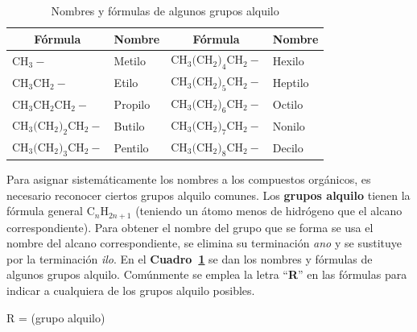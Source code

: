 \begin{table}[hbt]
\caption[Grupos alquilo]{Nombres y f\'ormulas de algunos grupos alquilo}
\label{a-nom}
\begin{center}
\begin{tabular}{ll l l}\hline
\multicolumn{1}{c}{\textbf{F\'ormula}}&\multicolumn{1}{c}{\textbf{Nombre}}&
 \multicolumn{1}{c}{\textbf{F\'ormula}}&\multicolumn{1}{c}{\textbf{Nombre}}\\ \hline
CH$_3-$                & Metilo  &CH$_3($CH$_2)_4$CH$_2-$ & Hexilo \\
CH$_3$CH$_2-$          & Etilo   &CH$_3($CH$_2)_5$CH$_2-$ & Heptilo \\
CH$_3$CH$_2$CH$_2-$    & Propilo &CH$_3($CH$_2)_6$CH$_2-$ & Octilo \\
CH$_3($CH$_2)_2$CH$_2-$& Butilo  &CH$_3($CH$_2)_7$CH$_2-$ & Nonilo \\
CH$_3($CH$_2)_3$CH$_2-$& Pentilo &CH$_3($CH$_2)_8$CH$_2-$ & Decilo \\\hline
\end{tabular}
\end{center}
\end{table}
Para asignar sistem\'aticamente los nombres a los compuestos org\'anicos, es necesario  reconocer ciertos grupos \gls{alquilo} comunes. Los \textbf{grupos alquilo}  tienen la f\'ormula general C$_n$H$_{2n+1}$ (teniendo un \'atomo menos de hi\-dr\'o\-ge\-no que el alcano correspondiente). Para obtener el nombre del grupo que se forma se usa el nombre del alcano correspondiente, se elimina su
terminaci\'on \textit{ano} y se sustituye por la terminaci\'on \textit{ilo}. En el \textbf{Cuadro~\ref{a-nom}} se dan  los nombres y f\'ormulas de algunos grupos alquilo. Com\'unmente se emplea la letra ``\textbf{R}'' en las f\'ormulas para indicar a cualquiera de los grupos alquilo posibles.

\hskip1.5in R =  \hspace{.2in} (grupo alquilo)

